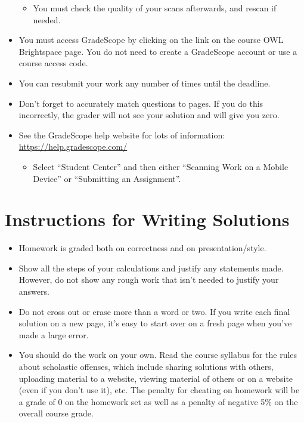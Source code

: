 \documentclass[12pt]{article}
\begin{document}
\begin{itemize}
\begin{itemize}
        \item You must check the quality of your scans afterwards, and rescan if needed.
    \end{itemize}
    \item You must access GradeScope by clicking on the link on the course OWL Brightspace page. You do not need to create a GradeScope account or use a course access code.
    \item You can resubmit your work any number of times until the deadline.
    \item Don’t forget to accurately match questions to pages. If you do this incorrectly, the grader will not see your solution and will give you zero.
    \item See the GradeScope help website for lots of information: \url{https://help.gradescope.com/}
    \begin{itemize}
        \item Select “Student Center” and then either “Scanning Work on a Mobile Device” or “Submitting an Assignment”.
    \end{itemize}
\end{itemize}

\section*{Instructions for Writing Solutions}

\begin{itemize}
    \item Homework is graded both on correctness and on presentation/style.
    \item Show all the steps of your calculations and justify any statements made. However, do not show any rough work that isn’t needed to justify your answers.
    \item Do not cross out or erase more than a word or two. If you write each final solution on a new page, it’s easy to start over on a fresh page when you’ve made a large error.
    \item You should do the work on your own. Read the course syllabus for the rules about scholastic offenses, which include sharing solutions with others, uploading material to a website, viewing material of others or on a website (even if you don’t use it), etc. The penalty for cheating on homework will be a grade of 0 on the homework set as well as a penalty of negative 5\% on the overall course grade.
\end{itemize}
\end{document}
